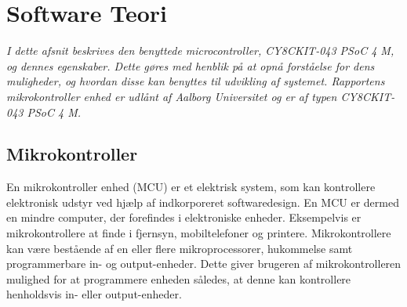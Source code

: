 \section{Software Teori}
\textit{I dette afsnit beskrives den benyttede microcontroller, CY8CKIT-043 PSoC 4 M, og dennes egenskaber. Dette gøres med henblik på at opnå forståelse for dens muligheder, og hvordan disse kan benyttes til udvikling af systemet. \newline
Rapportens mikrokontroller enhed er udlånt af Aalborg Universitet og er af typen CY8CKIT-043 PSoC 4 M.}

\subsection{Mikrokontroller}
En mikrokontroller enhed (MCU) er et elektrisk system, som kan kontrollere elektronisk udstyr ved hjælp af indkorporeret softwaredesign. En MCU er dermed en mindre computer, der forefindes i elektroniske enheder. Eksempelvis er mikrokontrollere at finde i fjernsyn, mobiltelefoner og printere. \citep{Scienceuddannelse,Tanenbaum2006} \newline
Mikrokontrollere kan være bestående af en eller flere mikroprocessorer, hukommelse samt programmerbare in- og output-enheder. Dette giver brugeren af mikrokontrolleren mulighed for at programmere enheden således, at denne kan kontrollere henholdsvis in- eller output-enheder. \citep{Scienceuddannelse,Tanenbaum2006}

